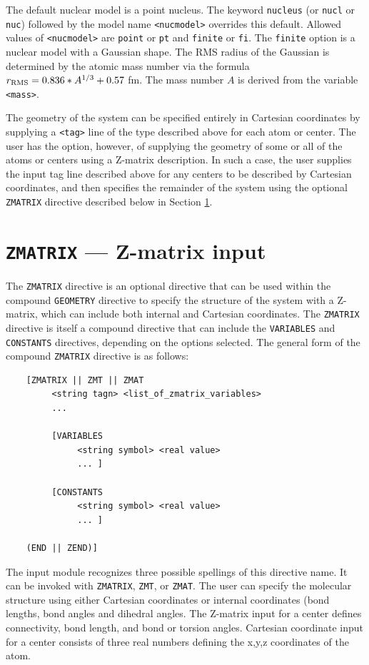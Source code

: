 The default nuclear model is a point nucleus. The keyword \verb+nucleus+ (or
\verb+nucl+ or \verb+nuc+) followed by the model name \verb+<nucmodel>+ 
overrides this default. Allowed values of \verb+<nucmodel>+ are \verb+point+ or
\verb+pt+ and \verb+finite+ or \verb+fi+. The \verb+finite+ option is
a nuclear model with a Gaussian shape. The RMS radius of the Gaussian is
determined by the atomic mass number via the formula $r_{\rm RMS} = 0.836*
A^{1/3} + 0.57$ fm.  The mass number $A$ is derived from the variable
\verb+<mass>+.

The geometry of the system can be specified entirely in Cartesian
coordinates by supplying a \verb+<tag>+ line of the type described
above for each atom or center.  The user has the option, however, of
supplying the geometry of some or all of the atoms or centers using a
Z-matrix description.  In such a case, the user supplies the input tag
line described above for any centers to be described by Cartesian
coordinates, and then specifies the remainder of the system using the
optional \verb+ZMATRIX+ directive described below in Section
\ref{sec:Z-matrix}.

\section{{\tt ZMATRIX} --- Z-matrix input}
\label{sec:Z-matrix}

The \verb+ZMATRIX+ directive is an optional directive that can be used
within the compound \verb+GEOMETRY+ directive to specify the structure
of the system with a Z-matrix, which can include both internal and
Cartesian coordinates.  The \verb+ZMATRIX+ directive is itself a
compound directive that can include the \verb+VARIABLES+ and
\verb+CONSTANTS+ directives, depending on the options selected.  The
general form of the compound \verb+ZMATRIX+ directive is as follows:
\begin{verbatim}
    [ZMATRIX || ZMT || ZMAT
         <string tagn> <list_of_zmatrix_variables> 
         ... 

         [VARIABLES
              <string symbol> <real value>
              ... ]
 
         [CONSTANTS
              <string symbol> <real value>
              ... ]

    (END || ZEND)]
\end{verbatim}

The input module recognizes three possible spellings of this directive
name.  It can be invoked with \verb+ZMATRIX+, \verb+ZMT+, or
\verb+ZMAT+.  The user can specify the molecular structure using
either Cartesian coordinates or
internal coordinates (bond lengths, bond angles and dihedral angles.
The Z-matrix input for a center defines connectivity, bond length, and
bond or torsion angles.  Cartesian coordinate input for a center
consists of three real numbers defining the x,y,z coordinates of the
atom.

